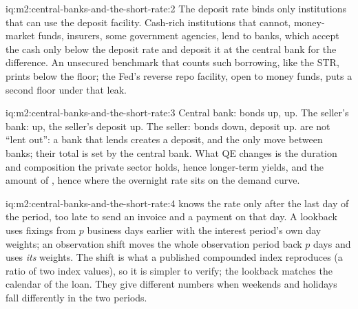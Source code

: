 \begin{solution}{iq:m2:central-banks-and-the-short-rate:2}
The deposit rate binds only institutions that can use the deposit facility.
Cash-rich institutions that cannot, money-market funds, insurers, some
government agencies, lend to banks, which accept the cash only below the
deposit rate and deposit it at the central bank for the difference. An
unsecured benchmark that counts such borrowing, like the \texteuro STR, prints
below the floor; the Fed's reverse repo facility, open to money funds, puts a
second floor under that leak.
\end{solution}

\begin{solution}{iq:m2:central-banks-and-the-short-rate:3}
Central bank: bonds up,  up. The seller's bank:  up, the
seller's deposit up. The seller: bonds down, deposit up.  are not
``lent out'': a bank that lends creates a deposit, and the  only move
between banks; their total is set by the central bank. What QE changes is the
duration and composition the private sector holds, hence longer-term yields,
and the amount of , hence where the overnight rate sits on the demand
curve.
\end{solution}

\begin{solution}{iq:m2:central-banks-and-the-short-rate:4}
 knows the rate only after the last day of the period,
too late to send an invoice and a payment on that day. A lookback uses
fixings from $p$ business days earlier with the interest period's own day
weights; an observation shift moves the whole observation period back $p$
days and uses \emph{its} weights. The shift is what a published compounded
index reproduces (a ratio of two index values), so it is simpler to verify;
the lookback matches the calendar of the loan. They give different numbers
when weekends and holidays fall differently in the two periods.
\end{solution}

